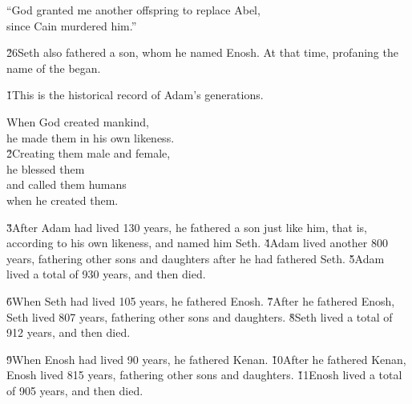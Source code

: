 \begin{poetry}
\poeml ``God granted me another offspring to replace Abel, \\
\poemll    since Cain murdered him.''
\end{poetry}

\v{26}Seth also fathered a son, whom he named Enosh. At that time, profaning the name of the  began.

\v{1}This is the historical record of Adam's generations.

\begin{poetry}
\poeml When God created mankind, \\
\poemll    he made them in his own likeness. \\
\poeml \v{2}Creating them male and female, \\
\poemll    he blessed them \\
\poeml and called them humans \\
\poemll    when he created them.
\end{poetry}

\v{3}After Adam had lived 130 years, he fathered a son just like him, that is, according to his own likeness, and named him Seth. \v{4}Adam lived another 800 years, fathering other sons and daughters after he had fathered Seth. \v{5}Adam lived a total of 930 years, and then died.

\v{6}When Seth had lived 105 years, he fathered Enosh. \v{7}After he fathered Enosh, Seth lived 807 years, fathering other sons and daughters. \v{8}Seth lived a total of 912 years, and then died.

\v{9}When Enosh had lived 90 years, he fathered Kenan. \v{10}After he fathered Kenan, Enosh lived 815 years, fathering other sons and daughters. \v{11}Enosh lived a total of 905 years, and then died.

